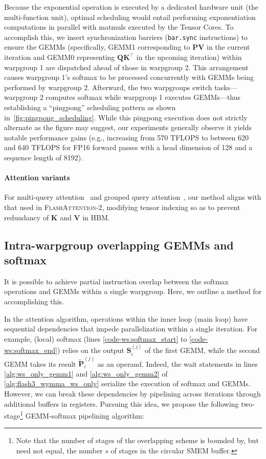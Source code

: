 \begin{enumerate}
Because the exponential operation is executed by a dedicated hardware unit (the multi-function unit), optimal scheduling would entail performing exponentiation computations in parallel with matmuls executed by the Tensor Cores. To accomplish this, we insert synchronization barriers (\texttt{bar.sync} instructions) to ensure the GEMMs (specifically, GEMM1 corresponding to $\mathbf{P} \mathbf{V}$ in the current iteration and GEMM0 representing $\mathbf{Q} \mathbf{K}^\top$ in the upcoming iteration) within warpgroup 1 are dispatched ahead of those in warpgroup 2. This arrangement causes warpgroup 1's softmax to be processed concurrently with GEMMs being performed by warpgroup 2. Afterward, the two warpgroups switch tasks—warpgroup 2 computes softmax while warpgroup 1 executes GEMMs—thus establishing a “pingpong” scheduling pattern as shown in~\cref{fig:pingpong_scheduling}. While this pingpong execution does not strictly alternate as the figure may suggest, our experiments generally observe it yields notable performance gains (e.g., increasing from 570 TFLOPS to between 620 and 640 TFLOPS for FP16 forward passes with a head dimension of 128 and a sequence length of 8192).

\paragraph{Attention variants} For multi-query attention~\citep{shazeer2019fast} and grouped query attention~\citep{ainslie2023gqa}, our method aligns with that used in \textsc{FlashAttention-2}, modifying tensor indexing so as to prevent redundancy of $\mathbf{K}$ and $\mathbf{V}$ in HBM.

\subsection{Intra-warpgroup overlapping GEMMs and softmax}

It is possible to achieve partial instruction overlap between the softmax operations and GEMMs within a single warpgroup. Here, we outline a method for accomplishing this.

In the attention algorithm, operations within the inner loop (main loop) have sequential dependencies that impede parallelization within a single iteration. For example, (local) softmax (lines \ref{code-ws:softmax_start} to \ref{code-ws:softmax_end}) relies on the output $\mathbf{S}_i^{(j)}$ of the first GEMM, while the second GEMM takes its result $\widetilde{\mathbf{P}}_i^{(j)}$ as an operand. Indeed, the wait statements in lines \ref{alg:ws_only_gemm1} and \ref{alg:ws_only_gemm2} of \cref{alg:flash3_wgmma_ws_only} serialize the execution of softmax and GEMMs. However, we can break these dependencies by pipelining across iterations through additional buffers in registers. Pursuing this idea, we propose the following two-stage\footnote{Note that the number of stages of the overlapping scheme is bounded by, but need not equal, the number $s$ of stages in the circular SMEM buffer.} GEMM-softmax pipelining algorithm:


\end{enumerate}
